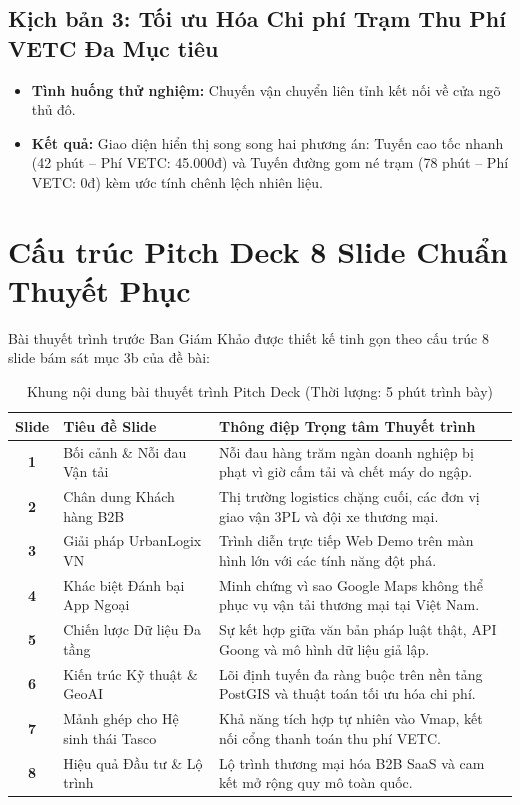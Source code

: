 \documentclass[11pt,a4paper]{article}
\begin{document}
\subsection{Kịch bản 3: Tối ưu Hóa Chi phí Trạm Thu Phí VETC Đa Mục tiêu}
\begin{itemize}
  \item \textbf{Tình huống thử nghiệm:} Chuyến vận chuyển liên tỉnh kết nối về cửa ngõ thủ đô.
  \item \textbf{Kết quả:} Giao diện hiển thị song song hai phương án: Tuyến cao tốc nhanh (42 phút -- Phí VETC: 45.000đ) và Tuyến đường gom né trạm (78 phút -- Phí VETC: 0đ) kèm ước tính chênh lệch nhiên liệu.
\end{itemize}

\section{Cấu trúc Pitch Deck 8 Slide Chuẩn Thuyết Phục}

Bài thuyết trình trước Ban Giám Khảo được thiết kế tinh gọn theo cấu trúc 8 slide bám sát mục 3b của đề bài:

\begin{table}[htbp]
  \centering
  \small
  \caption{Khung nội dung bài thuyết trình Pitch Deck (Thời lượng: 5 phút trình bày)}
  \label{tab:pitchdeck}
  \begin{tabularx}{\textwidth}{c l Y}
    \toprule
     \color{white}\textbf{Slide} & \color{white}\textbf{Tiêu đề Slide} & \color{white}\textbf{Thông điệp Trọng tâm Thuyết trình} \\
    \midrule
    \textbf{1} & Bối cảnh \& Nỗi đau Vận tải & Nỗi đau hàng trăm ngàn doanh nghiệp bị phạt vì giờ cấm tải và chết máy do ngập. \\
    \textbf{2} & Chân dung Khách hàng B2B & Thị trường logistics chặng cuối, các đơn vị giao vận 3PL và đội xe thương mại. \\
    \textbf{3} & Giải pháp UrbanLogix VN & Trình diễn trực tiếp Web Demo trên màn hình lớn với các tính năng đột phá. \\
    \textbf{4} & Khác biệt Đánh bại App Ngoại & Minh chứng vì sao Google Maps không thể phục vụ vận tải thương mại tại Việt Nam. \\
    \textbf{5} & Chiến lược Dữ liệu Đa tầng & Sự kết hợp giữa văn bản pháp luật thật, API Goong và mô hình dữ liệu giả lập. \\
    \textbf{6} & Kiến trúc Kỹ thuật \& GeoAI & Lõi định tuyến đa ràng buộc trên nền tảng PostGIS và thuật toán tối ưu hóa chi phí. \\
    \textbf{7} & Mảnh ghép cho Hệ sinh thái Tasco & Khả năng tích hợp tự nhiên vào Vmap, kết nối cổng thanh toán thu phí VETC. \\
    \textbf{8} & Hiệu quả Đầu tư \& Lộ trình & Lộ trình thương mại hóa B2B SaaS và cam kết mở rộng quy mô toàn quốc. \\
    \bottomrule
  \end{tabularx}
\end{table}
\end{document}
